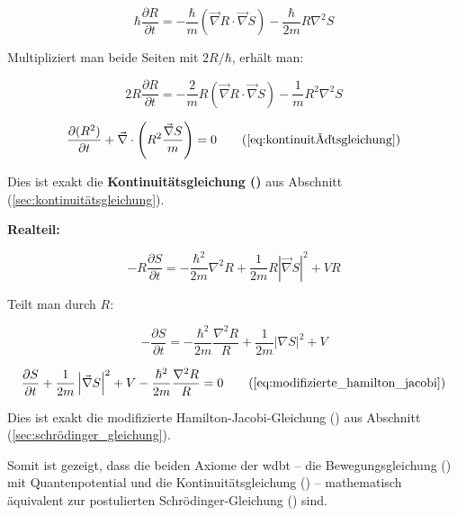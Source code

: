 \begin{equation}
    \hbar \frac{\partial R}{\partial t} = -\frac{\hbar}{m} (\vec{\nabla} R \cdot \vec{\nabla} S) - \frac{\hbar}{2m} R \nabla^2 S
\end{equation}

Multipliziert man beide Seiten mit $2R/\hbar$, erhält man:

\begin{equation}
    2R \frac{\partial R}{\partial t} = -\frac{2}{m} R (\vec{\nabla} R \cdot \vec{\nabla} S) - \frac{1}{m} R^2 \nabla^2 S
\end{equation}

\begin{equation}
    \frac{\partial (R^2)}{\partial t} + \vec{\nabla} \cdot \left( R^2 \frac{\vec{\nabla} S}{m} \right) = 0 \tag{\refeq{eq:kontinuitätsgleichung}}
\end{equation}

Dies ist exakt die \textbf{Kontinuitätsgleichung ()} aus Abschnitt (\ref{sec:kontinuitätsgleichung}).

\textbf{Realteil:}

\begin{equation}
    - R \frac{\partial S}{\partial t} = -\frac{\hbar^2}{2m} \nabla^2 R + \frac{1}{2m} R \left| \vec{\nabla} S \right|^2 + V R
\end{equation}

Teilt man durch $R$:

\begin{equation}
    - \frac{\partial S}{\partial t} = -\frac{\hbar^2}{2m} \frac{\nabla^2 R}{R} + \frac{1}{2m} |\nabla S|^2 + V
\end{equation}

\begin{equation}
    \frac{\partial S}{\partial t} + \frac{1}{2m} \left| \vec{\nabla} S \right|^2 + V - \frac{\hbar^2}{2m} \frac{\nabla^2 R}{R} = 0 \tag{\refeq{eq:modifizierte_hamilton_jacobi}}
\end{equation}

Dies ist exakt die modifizierte Hamilton-Jacobi-Gleichung () aus Abschnitt (\ref{sec:schrödinger_gleichung}).

Somit ist gezeigt, dass die beiden Axiome der \gls{wdbt} – die Bewegungsgleichung () mit Quantenpotential und die Kontinuitätsgleichung
() – mathematisch äquivalent zur postulierten Schrödinger-Gleichung () sind.

